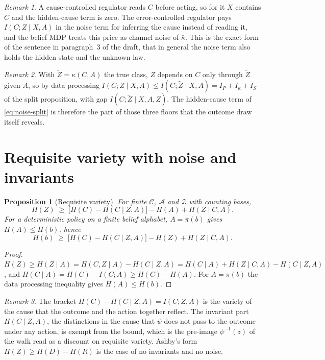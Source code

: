 \documentclass[10pt]{article}
\theoremstyle{plain}
\newtheorem{proposition}{Proposition}
\theoremstyle{remark}
\newtheorem{remark}{Remark}
\newcommand{\Acal}{\mathcal A}
\newcommand{\Zcal}{\mathcal Z}
\newcommand{\Ccal}{\mathcal C}
\begin{document}
\begin{remark}
A cause-controlled regulator reads $C$ before acting, so for it $X$ contains $C$ and the hidden-cause term is zero.
The error-controlled regulator pays $I(C; Z \mid X, A)$ in the noise term for inferring the cause instead of reading it, and the belief MDP treats this price as channel noise of $\bar\kappa$.
This is the exact form of the sentence in paragraph~3 of the draft, that in general the noise term also holds the hidden state and the unknown law.
\end{remark}

\begin{remark}
With $\tilde Z = \kappa(C,A)$ the true class, $Z$ depends on $C$ only through $\tilde Z$ given $A$, so by data processing $I(C; Z \mid X, A) \le I(C; \tilde Z \mid X, A) = \bar I_P + \bar I_\kappa + \bar I_S$ of the split proposition, with gap $I(C; \tilde Z \mid X, A, Z)$.
The hidden-cause term of \eqref{eq:noise-split} is therefore the part of those three floors that the outcome draw itself reveals.
\end{remark}

\section{Requisite variety with noise and invariants}
\begin{proposition}[Requisite variety]
\label{prop:variety}
For finite $\Ccal$, $\Acal$ and $\Zcal$ with counting bases,
\begin{equation}
  H(Z) \;\ge\; \big[H(C) - H(C \mid Z, A)\big] - H(A) + H(Z \mid C, A).
  \label{eq:variety}
\end{equation}
For a deterministic policy on a finite belief alphabet, $A = \pi(b)$ gives $H(A) \le H(b)$, hence
\begin{equation}
  H(b) \;\ge\; \big[H(C) - H(C \mid Z, A)\big] - H(Z) + H(Z \mid C, A).
  \label{eq:variety-model}
\end{equation}
\end{proposition}
\begin{proof}
$H(Z) \ge H(Z \mid A) = H(C, Z \mid A) - H(C \mid Z, A) = H(C \mid A) + H(Z \mid C, A) - H(C \mid Z, A)$, and $H(C \mid A) = H(C) - I(C;A) \ge H(C) - H(A)$.
For $A = \pi(b)$ the data processing inequality gives $H(A) \le H(b)$.
\end{proof}

\begin{remark}
The bracket $H(C) - H(C \mid Z, A) = I(C; Z, A)$ is the variety of the cause that the outcome and the action together reflect.
The invariant part $H(C \mid Z, A)$, the distinctions in the cause that $\psi$ does not pass to the outcome under any action, is exempt from the bound, which is the pre-image $\psi^{-1}(z)$ of the walk read as a discount on requisite variety.
Ashby's form $H(Z) \ge H(D) - H(R)$ is the case of no invariants and no noise.
\end{remark}
\end{document}
